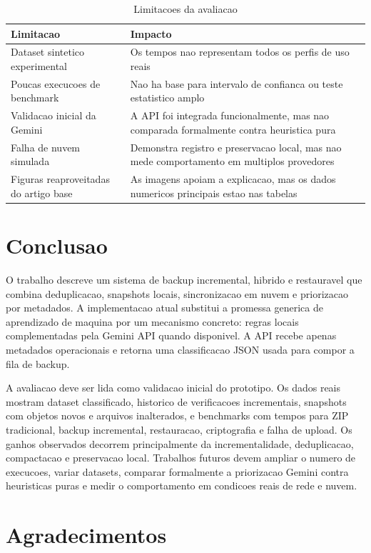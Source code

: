 \documentclass[12pt,a4paper]{article}
\begin{document}
\begin{table}[h]
\centering
\caption{Limitacoes da avaliacao}
\begin{tabular}{L{0.36\textwidth}L{0.50\textwidth}}
\toprule
Limitacao & Impacto \\
\midrule
Dataset sintetico experimental & Os tempos nao representam todos os perfis de uso reais \\
Poucas execucoes de benchmark & Nao ha base para intervalo de confianca ou teste estatistico amplo \\
Validacao inicial da Gemini & A API foi integrada funcionalmente, mas nao comparada formalmente contra heuristica pura \\
Falha de nuvem simulada & Demonstra registro e preservacao local, mas nao mede comportamento em multiplos provedores \\
Figuras reaproveitadas do artigo base & As imagens apoiam a explicacao, mas os dados numericos principais estao nas tabelas \\
\bottomrule
\end{tabular}
\end{table}

\section{Conclusao}

O trabalho descreve um sistema de backup incremental, hibrido e restauravel que combina deduplicacao, snapshots locais, sincronizacao em nuvem e priorizacao por metadados. A implementacao atual substitui a promessa generica de aprendizado de maquina por um mecanismo concreto: regras locais complementadas pela Gemini API quando disponivel. A API recebe apenas metadados operacionais e retorna uma classificacao JSON usada para compor a fila de backup.

A avaliacao deve ser lida como validacao inicial do prototipo. Os dados reais mostram dataset classificado, historico de verificacoes incrementais, snapshots com objetos novos e arquivos inalterados, e benchmarks com tempos para ZIP tradicional, backup incremental, restauracao, criptografia e falha de upload. Os ganhos observados decorrem principalmente da incrementalidade, deduplicacao, compactacao e preservacao local. Trabalhos futuros devem ampliar o numero de execucoes, variar datasets, comparar formalmente a priorizacao Gemini contra heuristicas puras e medir o comportamento em condicoes reais de rede e nuvem.

\section{Agradecimentos}
\end{document}
